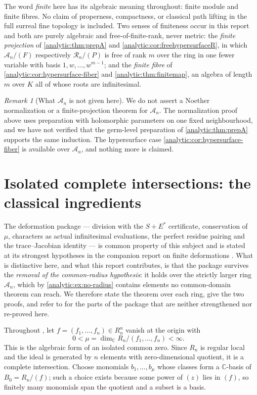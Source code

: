 \documentclass[11pt,letterpaper]{article}
\theoremstyle{definition}
\theoremstyle{remark}
\newtheorem{remark}[theorem]{Remark}
\newcommand{\C}{\mathbb C}
\newcommand{\A}{\mathscr A}
\newcommand{\RR}{\mathscr R}
\numberwithin{equation}{section}
\begin{document}
The word \emph{finite} here has its algebraic meaning throughout: finite
module and finite fibres. No claim of properness, compactness, or classical
path lifting in the full surreal fine topology is included. Two senses of
finiteness occur in this report and both are purely algebraic and
free-of-finite-rank, never metric: the \emph{finite projection} of
\cref{analytic:thm:prepA} and \cref{analytic:cor:freehypersurfaceR}, in
which $\A_n/(F)$ respectively $\RR_n/(P)$ is free of rank $m$ over the ring
in one fewer variable with basis $1,w,\ldots,w^{m-1}$; and the \emph{finite
fibre} of \cref{analytic:cor:hypersurface-fiber} and
\cref{analytic:thm:finitemap}, an algebra of length $m$ over $K$ all of
whose roots are infinitesimal.

\begin{remark}[What $\A_n$ is not given here]
\label{analytic:rem:no-normalization-A}
We do not assert a Noether normalization or a finite-projection theorem for
$\A_n$. The normalization proof above uses preparation with holomorphic
parameters on one fixed neighbourhood, and we have not verified that the
germ-level preparation of \cref{analytic:thm:prepA} supports the same
induction. The hypersurface case \cref{analytic:cor:hypersurface-fiber} is
available over $\A_n$, and nothing more is claimed.
\end{remark}

\section{Isolated complete intersections: the classical ingredients}
\label{analytic:sec:ordinary}

The deformation package --- division with the $S+E^*$ certificate,
conservation of $\mu$, characters as actual infinitesimal evaluations, the
perfect residue pairing and the trace--Jacobian identity --- is common
property of this subject and is stated at its strongest hypotheses in the
companion report on finite deformations \cite{FiniteDeformations}. What is
distinctive here, and what this report contributes, is that the package
survives the \emph{removal of the common-radius hypothesis}: it holds over
the strictly larger ring $\A_n$, which by \cref{analytic:ex:no-radius}
contains elements no common-domain theorem can reach. We therefore state
the theorem over each ring, give the two proofs, and refer to
\cite{FiniteDeformations} for the parts of the package that are neither
strengthened nor re-proved here.

Throughout , let
$f=(f_1,\ldots,f_n)\in R_n^n$ vanish at the origin with
\begin{equation}\label{analytic:eq:mu}
 0<\mu=\dim_\C R_n/(f_1,\ldots,f_n)<\infty .
\end{equation}
This is the algebraic form of an isolated common zero. Since $R_n$ is
regular local and the ideal is generated by $n$ elements with
zero-dimensional quotient, it is a complete intersection. Choose monomials
$b_1,\ldots,b_\mu$ whose classes form a $\C$-basis of $B_0=R_n/(f)$; such a
choice exists because some power of $(z)$ lies in $(f)$, so finitely many
monomials span the quotient and a subset is a basis.
\end{document}
